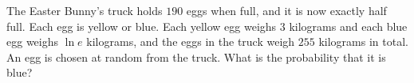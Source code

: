The Easter Bunny's truck holds $190$ eggs when full, and it is now exactly half full. Each egg is yellow or blue. Each yellow egg weighs $3$ kilograms and each blue egg weighs $\ln e$ kilograms, and the eggs in the truck weigh $255$ kilograms in total. An egg is chosen at random from the truck. What is the probability that it is blue?
